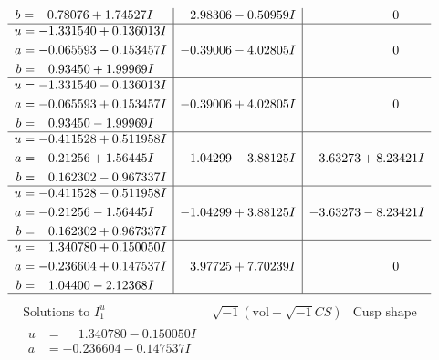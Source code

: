 \documentclass[1p]{elsarticle_modified}
\theoremstyle{definition}
\newcommand{\I}{\sqrt{-1}}
\begin{document}
$$\begin{array}{c|c|c}
\begin{aligned}
b &= \phantom{-}0.78076 + 1.74527 I\end{aligned}
 & \phantom{-}2.98306 - 0.50959 I & \phantom{-0.000000 } 0 \\ \hline\begin{aligned}
u &= -1.331540 + 0.136013 I \\
a &= -0.065593 - 0.153457 I \\
b &= \phantom{-}0.93450 + 1.99969 I\end{aligned}
 & -0.39006 - 4.02805 I & \phantom{-0.000000 } 0 \\ \hline\begin{aligned}
u &= -1.331540 - 0.136013 I \\
a &= -0.065593 + 0.153457 I \\
b &= \phantom{-}0.93450 - 1.99969 I\end{aligned}
 & -0.39006 + 4.02805 I & \phantom{-0.000000 } 0 \\ \hline\begin{aligned}
u &= -0.411528 + 0.511958 I \\
a &= -0.21256 + 1.56445 I \\
b &= \phantom{-}0.162302 - 0.967337 I\end{aligned}
 & -1.04299 - 3.88125 I & -3.63273 + 8.23421 I \\ \hline\begin{aligned}
u &= -0.411528 - 0.511958 I \\
a &= -0.21256 - 1.56445 I \\
b &= \phantom{-}0.162302 + 0.967337 I\end{aligned}
 & -1.04299 + 3.88125 I & -3.63273 - 8.23421 I \\ \hline\begin{aligned}
u &= \phantom{-}1.340780 + 0.150050 I \\
a &= -0.236604 + 0.147537 I \\
b &= \phantom{-}1.04400 - 2.12368 I\end{aligned}
 & \phantom{-}3.97725 + 7.70239 I & \phantom{-0.000000 } 0\\
 \hline 
 \end{array}$$\newpage$$\begin{array}{c|c|c}  
\text{Solutions to }I^u_{1}& \I (\text{vol} + \sqrt{-1}CS) & \text{Cusp shape}\\
 \hline 
\begin{aligned}
u &= \phantom{-}1.340780 - 0.150050 I \\
a &= -0.236604 - 0.147537 I \\

\end{aligned}
\end{array}$$
\end{document}

